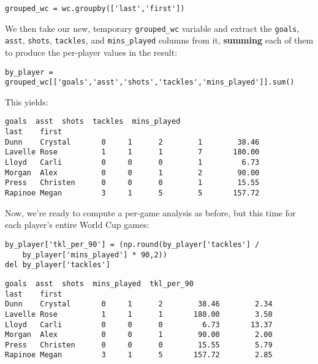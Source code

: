 \begin{Verbatim}[fontsize=\footnotesize,samepage=true,frame=single,framesep=3mm]
grouped_wc = wc.groupby(['last','first'])
\end{Verbatim}

We then take our new, temporary \texttt{grouped\_wc} variable and extract the
\texttt{goals}, \texttt{asst}, \texttt{shots}, \texttt{tackles}, and
\texttt{mins\_played} columns from it, \textbf{summing} each of them to produce
the per-player values in the result:


\begin{Verbatim}[fontsize=\footnotesize,samepage=true,frame=single,framesep=3mm]
by_player = grouped_wc[['goals','asst','shots','tackles','mins_played']].sum()
\end{Verbatim}

This yields:

\begin{Verbatim}[fontsize=\small,samepage=true,frame=leftline,framesep=5mm,framerule=1mm]
                  goals  asst  shots  tackles  mins_played
last    first                                             
Dunn    Crystal       0     1      2        1        38.46
Lavelle Rose          1     1      1        7       180.00
Lloyd   Carli         0     0      0        1         6.73
Morgan  Alex          0     0      1        2        90.00
Press   Christen      0     0      0        1        15.55
Rapinoe Megan         3     1      5        5       157.72
\end{Verbatim}

Now, we're ready to compute a per-game analysis as before, but this time for
each player's entire World Cup games:

\begin{Verbatim}[fontsize=\small,samepage=true,frame=single,framesep=3mm]
by_player['tkl_per_90'] = (np.round(by_player['tackles'] /
    by_player['mins_played'] * 90,2))
del by_player['tackles']
\end{Verbatim}
\vspace{-.2in}

\begin{Verbatim}[fontsize=\small,samepage=true,frame=leftline,framesep=5mm,framerule=1mm]
                  goals  asst  shots  mins_played  tkl_per_90
last    first                                                
Dunn    Crystal       0     1      2        38.46        2.34
Lavelle Rose          1     1      1       180.00        3.50
Lloyd   Carli         0     0      0         6.73       13.37
Morgan  Alex          0     0      1        90.00        2.00
Press   Christen      0     0      0        15.55        5.79
Rapinoe Megan         3     1      5       157.72        2.85
\end{Verbatim}

